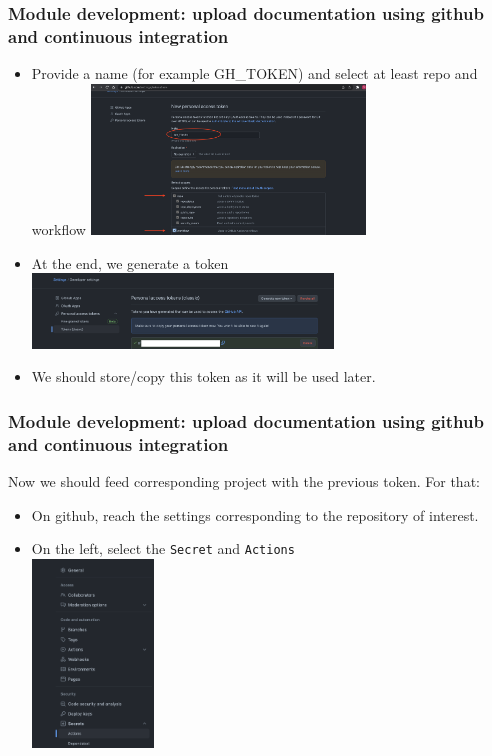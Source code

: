 \documentclass[8pt]{beamer}
\begin{document}
\begin{frame}
  \frametitle{Module development: upload documentation using github and continuous integration}
    \begin{itemize}
      \item Provide a name (for example GH\_TOKEN) and select at least repo and workflow
     \includegraphics[width=8.cm, height=4cm]{new_token.png}
    \item At the end, we generate a token
    \includegraphics[width=8.cm, height=2cm]{generated_token.png}
    \item We should store\slash copy this token as it will be used later.
      \end{itemize}
\end{frame}

\begin{frame}
  \frametitle{Module development: upload documentation using github and continuous integration}
  Now we should feed corresponding project with the previous token. For that:

    \begin{itemize}
      \item On github, reach the settings corresponding to the repository of interest.
      \item On the left, select the \texttt{Secret} and \texttt{Actions}\\
      \includegraphics[width=2.cm, height=5cm]{select_action.png}
      \end{itemize}
\end{frame}
\end{document}
